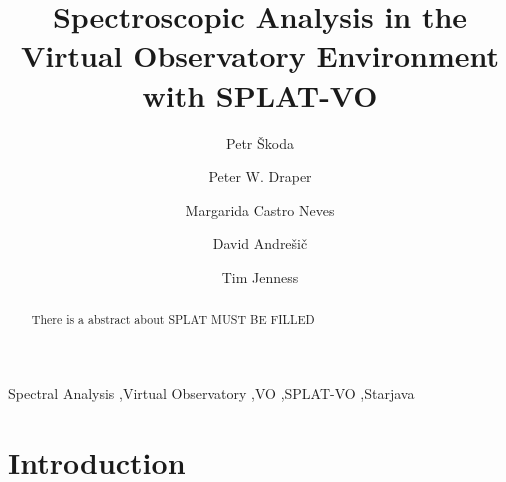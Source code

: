 \documentclass[final,authoryear,5p,times,twocolumn]{elsarticle}
\begin{document}
\begin{frontmatter}

\title{Spectroscopic Analysis in the Virtual Observatory Environment with SPLAT-VO}

\author[OND]{Petr \v{S}koda}
\author[DUR]{Peter W. Draper}
\author[HDB]{Margarida Castro Neves}
\author[VSB]{David Andre\v{s}i\v{c}}
\author[COR]{Tim Jenness}

\address[OND]{Astronomical Institute of the Academy of Sciences,Fri\v{c}ova~298, 251\,65, Ond\v{r}ejov, Czech Republic}
\address[DUR]{Department of Physics, Institute for Computational
Cosmology, University of Durham, South Road, Durham DH1 3LE, UK}
\address[HDB]{Universit\"a{}t Hyeidelberg, Astronomisches Rechen-Institut,
M\"o{}nchhofstra\ss{}e 12--14, 69120 Heidelberg, Germany}
\address[VSB]{Department of Computer Science, Faculty of Electrical
Engineering and Computer Science, V\v{S}B --- Technical University of Ostrava, 17. listopadu 15, 708 33 Ostrava-Poruba, Czech Republic}
\address[COR]{Department of Astronomy, Cornell University, Ithaca, NY 14853, USA}


\begin{abstract}
There is a abstract about SPLAT
MUST BE FILLED
\end{abstract}
\begin{keyword}
Spectral Analysis \sep Virtual Observatory \sep VO \sep SPLAT-VO \sep Starjava
\end{keyword}
\end{frontmatter}


\newcommand{\ascl}[1]{\href{http://www.ascl.net/#1}{ascl:#1}}

\section{Introduction}
\end{document}
